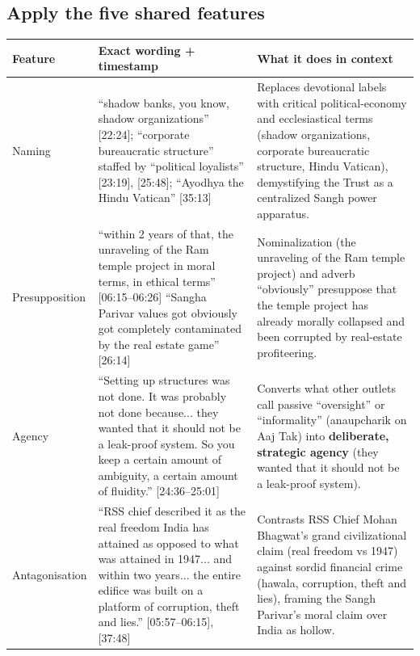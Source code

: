\documentclass[10pt,a4paper]{article}
\begin{document}
\subsection*{Apply the five shared features}
\par\vspace{4pt}
{\small
\begin{longtable}{@{}>{\raggedright\arraybackslash}p{} >{\raggedright\arraybackslash}p{} >{\raggedright\arraybackslash}p{}@{}}
\toprule
\textbf{Feature} & \textbf{Exact wording + timestamp} & \textbf{What it does in context} \\
\midrule
\endhead
Naming & ``shadow banks, you know, shadow organizations'' [22:24]; ``corporate bureaucratic structure'' staffed by ``political loyalists'' [23:19], [25:48]; ``Ayodhya the Hindu Vatican'' [35:13] & Replaces devotional labels with critical political-economy and ecclesiastical terms (shadow organizations, corporate bureaucratic structure, Hindu Vatican), demystifying the Trust as a centralized Sangh power apparatus. \\
\addlinespace[6pt]
Presupposition & ``within 2 years of that, the unraveling of the Ram temple project in moral terms, in ethical terms'' [06:15--06:26] \newline  ``Sangha Parivar values got obviously got completely contaminated by the real estate game'' [26:14] & Nominalization (the unraveling of the Ram temple project) and adverb ``obviously'' presuppose that the temple project has already morally collapsed and been corrupted by real-estate profiteering. \\
\addlinespace[6pt]
Agency & ``Setting up structures was not done. It was probably not done because... they wanted that it should not be a leak-proof system. So you keep a certain amount of ambiguity, a certain amount of fluidity.'' [24:36--25:01] & Converts what other outlets call passive ``oversight'' or ``informality'' (anaupcharik on Aaj Tak) into \textbf{deliberate, strategic agency} (they wanted that it should not be a leak-proof system). \\
\addlinespace[6pt]
Antagonisation & ``RSS chief described it as the real freedom India has attained as opposed to what was attained in 1947... and within two years... the entire edifice was built on a platform of corruption, theft and lies.'' [05:57--06:15], [37:48] & Contrasts RSS Chief Mohan Bhagwat's grand civilizational claim (real freedom vs 1947) against sordid financial crime (hawala, corruption, theft and lies), framing the Sangh Parivar's moral claim over India as hollow. \\

\end{longtable}}
\end{document}
